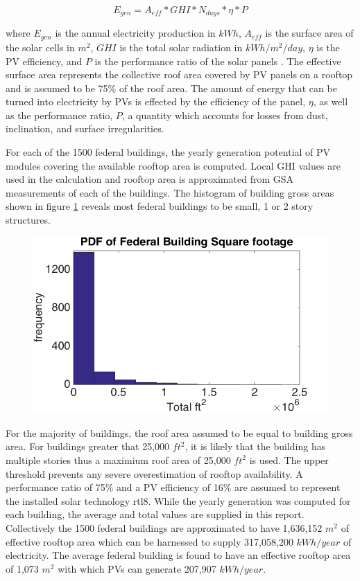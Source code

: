 \begin{equation}
E_{gen}=A_{eff}*GHI*N_{days}*\eta*P 
\end{equation}

where $E_{gen}$ is the annual electricity production in $kWh$, $A_{eff}$ is the surface area of the solar cells in $m^2$, $GHI$ is the total solar radiation in $kWh/m^{2}/day$, $\eta$ is the PV efficiency, and $P$ is the performance ratio of the solar panels \cite{rtl8}. The effective surface area represents the collective roof area covered by PV panels on a rooftop and is assumed to be 75\% of the roof area. The amount of energy that can be turned into electricity by PVs is effected by the efficiency of the panel, $\eta$, as well as the performance ratio, $P$, a quantity which accounts for losses from dust, inclination, and surface irregularities. 
\par
For each of the 1500 federal buildings, the yearly generation potential of PV modules covering the available rooftop area is computed.  Local GHI values are used in the calculation and rooftop area is approximated from GSA measurements of each of the buildings. The histogram of building gross areas shown in figure \ref{fig:rtl_pic1} reveals most federal buildings to be small, 1 or 2 story structures. 
\begin{figure}
  \begin{center}
    \includegraphics[scale=0.5]{pics/rtl_pic1}
  \end{center}
\label{fig:rtl_pic1}
\end{figure}

For the majority of buildings, the roof area assumed to be equal to building gross area. For buildings greater that 25,000 $ft^2$, it is likely that the building has multiple stories thus a maximium roof area of 25,000 $ft^2$ is used. The upper threshold prevents any severe overestimation of rooftop availability. A performance ratio of 75\% and a PV efficiency of 16\% are assumed to represent the installed solar technology \cite{roisin}{rtl8}. While the yearly generation was computed for each building, the average and total values are supplied in this report. Collectively the 1500 federal buildings are approximated to have 1,636,152 $m^2$ of effective rooftop area which can be harnessed to supply 317,058,200 $kWh/year$ of electricity. The average federal building is found to have an effective rooftop area of 1,073 $m^2$ with which PVs can generate 207,907 $kWh/year$.
\par 

